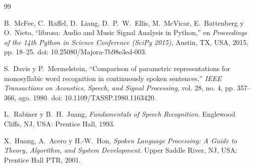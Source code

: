 \documentclass[12pt]{article}
\begin{document}
\begin{thebibliography}{99}

	B.~McFee, C.~Raffel, D.~Liang, D.~P.~W.~Ellis, M.~McVicar, E.~Battenberg y O.~Nieto, ``librosa: Audio and Music Signal Analysis in Python,'' en \textit{Proceedings of the 14th Python in Science Conference (SciPy 2015)}, Austin, TX, USA, 2015, pp. 18--25. doi: 10.25080/Majora-7b98e3ed-003.
	
	S.~Davis y P.~Mermelstein, ``Comparison of parametric representations for monosyllabic word recognition in continuously spoken sentences,'' \textit{IEEE Transactions on Acoustics, Speech, and Signal Processing}, vol. 28, no. 4, pp. 357--366, ago. 1980. doi: 10.1109/TASSP.1980.1163420.
	
	L.~Rabiner y B.~H.~Juang, \textit{Fundamentals of Speech Recognition}. Englewood Cliffs, NJ, USA: Prentice Hall, 1993.
	
	X.~Huang, A.~Acero y H.-W.~Hon, \textit{Spoken Language Processing: A Guide to Theory, Algorithm, and System Development}. Upper Saddle River, NJ, USA: Prentice Hall PTR, 2001.
\end{thebibliography}
	
\end{document}
